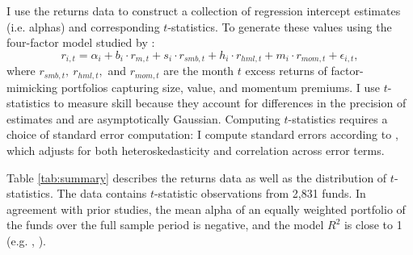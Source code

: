 	I use the returns data to construct a collection of regression intercept estimates (i.e. alphas) and corresponding $t$-statistics. To generate these values using the four-factor model studied by \citet{Carhart1997}:
	\begin{equation}
		\label{eqn:carhart}
		r_{i, t} = \alpha_{i} + b_{i} \cdot r_{m, t} + s_{i} \cdot r_{smb, t} + h_{i} \cdot r_{hml, t} + m_{i} \cdot r_{mom, t} + \epsilon_{i, t},
	\end{equation}
	where $r_{smb, t}, \ r_{hml, t},$ and $r_{mom, t}$ are the month $t$ excess returns of factor-mimicking portfolios capturing size, value, and momentum premiums.  I use $t$-statistics to measure skill because they account for differences in the precision of estimates and are asymptotically Gaussian.  Computing $t$-statistics requires a choice of standard error computation: I compute standard errors according to \citet{Newey1994}, which adjusts for both heteroskedasticity and correlation across error terms.

	Table \ref{tab:summary} describes the returns data as well as the distribution of $t$-statistics.  The data contains $t$-statistic observations from 2,831 funds.  In agreement with prior studies, the mean alpha of an equally weighted portfolio of the funds over the full sample period is negative, and the model $R^2$ is close to 1 (e.g. \citet{Barras2010}, \citet{Carhart1997}).

